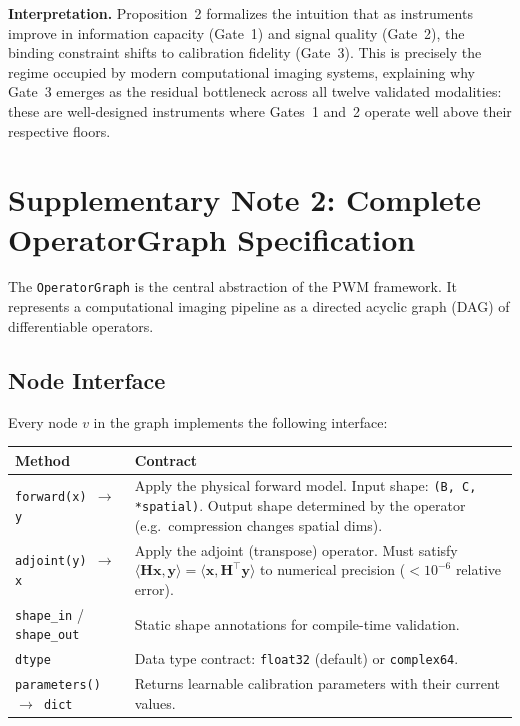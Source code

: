 \documentclass[11pt]{article}
\theoremstyle{definition}
\begin{document}
\noindent\textbf{Interpretation.}
Proposition~2 formalizes the intuition that as instruments improve in information capacity (Gate~1) and signal quality (Gate~2), the binding constraint shifts to calibration fidelity (Gate~3). This is precisely the regime occupied by modern computational imaging systems, explaining why Gate~3 emerges as the residual bottleneck across all twelve validated modalities: these are well-designed instruments where Gates~1 and~2 operate well above their respective floors.

\newpage

\section{Supplementary Note 2: Complete OperatorGraph Specification}
\label{sec:opgraph}

The \texttt{OperatorGraph} is the central abstraction of the PWM framework.
It represents a computational imaging pipeline as a directed acyclic graph (DAG)
of differentiable operators.

\subsection{Node Interface}

Every node $v$ in the graph implements the following interface:

\begin{center}
\renewcommand{\arraystretch}{1.3}
\begin{tabular}{lp{8cm}}
\toprule
\textbf{Method} & \textbf{Contract} \\
\midrule
\texttt{forward(x) $\to$ y} &
  Apply the physical forward model.  Input shape: \texttt{(B, C, *spatial)}.
  Output shape determined by the operator (e.g.\ compression changes spatial dims). \\
\texttt{adjoint(y) $\to$ x} &
  Apply the adjoint (transpose) operator.  Must satisfy
  $\langle \mathbf{H}\mathbf{x}, \mathbf{y}\rangle =
   \langle \mathbf{x}, \mathbf{H}^\top\mathbf{y}\rangle$
  to numerical precision ($<10^{-6}$ relative error). \\
\texttt{shape\_in} / \texttt{shape\_out} &
  Static shape annotations for compile-time validation. \\
\texttt{dtype} &
  Data type contract: \texttt{float32} (default) or \texttt{complex64}. \\
\texttt{parameters() $\to$ dict} &
  Returns learnable calibration parameters with their current values. \\
\bottomrule
\end{tabular}
\end{center}
\end{document}
